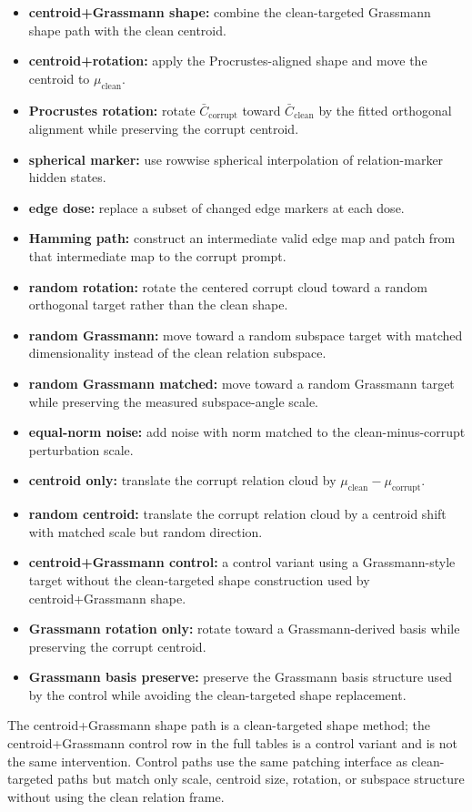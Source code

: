 \documentclass[11pt]{article}
\newcommand{\clean}{\mathrm{clean}}
\newcommand{\corr}{\mathrm{corrupt}}
\begin{document}
\begin{itemize}
\item \textbf{centroid+Grassmann shape:} combine the clean-targeted Grassmann shape path with the clean centroid.
\item \textbf{centroid+rotation:} apply the Procrustes-aligned shape and move the centroid to $\mu_{\clean}$.
\item \textbf{Procrustes rotation:} rotate $\bar C_{\corr}$ toward $\bar C_{\clean}$ by the fitted orthogonal alignment while preserving the corrupt centroid.
\item \textbf{spherical marker:} use rowwise spherical interpolation of relation-marker hidden states.
\item \textbf{edge dose:} replace a subset of changed edge markers at each dose.
\item \textbf{Hamming path:} construct an intermediate valid edge map and patch from that intermediate map to the corrupt prompt.
\item \textbf{random rotation:} rotate the centered corrupt cloud toward a random orthogonal target rather than the clean shape.
\item \textbf{random Grassmann:} move toward a random subspace target with matched dimensionality instead of the clean relation subspace.
\item \textbf{random Grassmann matched:} move toward a random Grassmann target while preserving the measured subspace-angle scale.
\item \textbf{equal-norm noise:} add noise with norm matched to the clean-minus-corrupt perturbation scale.
\item \textbf{centroid only:} translate the corrupt relation cloud by $\mu_{\clean}-\mu_{\corr}$.
\item \textbf{random centroid:} translate the corrupt relation cloud by a centroid shift with matched scale but random direction.
\item \textbf{centroid+Grassmann control:} a control variant using a Grassmann-style target without the clean-targeted shape construction used by centroid+Grassmann shape.
\item \textbf{Grassmann rotation only:} rotate toward a Grassmann-derived basis while preserving the corrupt centroid.
\item \textbf{Grassmann basis preserve:} preserve the Grassmann basis structure used by the control while avoiding the clean-targeted shape replacement.
\end{itemize}

The centroid+Grassmann shape path is a clean-targeted shape method; the centroid+Grassmann control row in the full tables is a control variant and is not the same intervention. Control paths use the same patching interface as clean-targeted paths but match only scale, centroid size, rotation, or subspace structure without using the clean relation frame.
\end{document}
